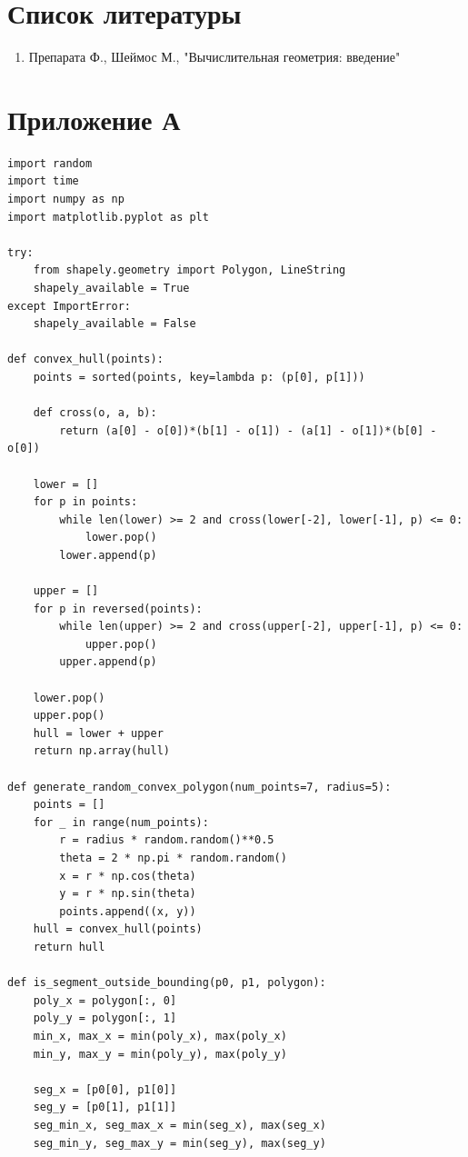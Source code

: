 \documentclass[areasetadvanced]{scrartcl}
\begin{document}
\section*{Список литературы}
\begin{enumerate}
    \item Препарата Ф., Шеймос М., "Вычислительная геометрия: введение"
\end{enumerate}
\newpage
\section*{Приложение А}
\begin{lstlisting}
import random
import time
import numpy as np
import matplotlib.pyplot as plt

try:
    from shapely.geometry import Polygon, LineString
    shapely_available = True
except ImportError:
    shapely_available = False

def convex_hull(points):
    points = sorted(points, key=lambda p: (p[0], p[1]))

    def cross(o, a, b):
        return (a[0] - o[0])*(b[1] - o[1]) - (a[1] - o[1])*(b[0] - o[0])

    lower = []
    for p in points:
        while len(lower) >= 2 and cross(lower[-2], lower[-1], p) <= 0:
            lower.pop()
        lower.append(p)

    upper = []
    for p in reversed(points):
        while len(upper) >= 2 and cross(upper[-2], upper[-1], p) <= 0:
            upper.pop()
        upper.append(p)

    lower.pop()
    upper.pop()
    hull = lower + upper
    return np.array(hull)

def generate_random_convex_polygon(num_points=7, radius=5):
    points = []
    for _ in range(num_points):
        r = radius * random.random()**0.5
        theta = 2 * np.pi * random.random()
        x = r * np.cos(theta)
        y = r * np.sin(theta)
        points.append((x, y))
    hull = convex_hull(points)
    return hull

def is_segment_outside_bounding(p0, p1, polygon):
    poly_x = polygon[:, 0]
    poly_y = polygon[:, 1]
    min_x, max_x = min(poly_x), max(poly_x)
    min_y, max_y = min(poly_y), max(poly_y)

    seg_x = [p0[0], p1[0]]
    seg_y = [p0[1], p1[1]]
    seg_min_x, seg_max_x = min(seg_x), max(seg_x)
    seg_min_y, seg_max_y = min(seg_y), max(seg_y)


\end{lstlisting}
\end{document}
